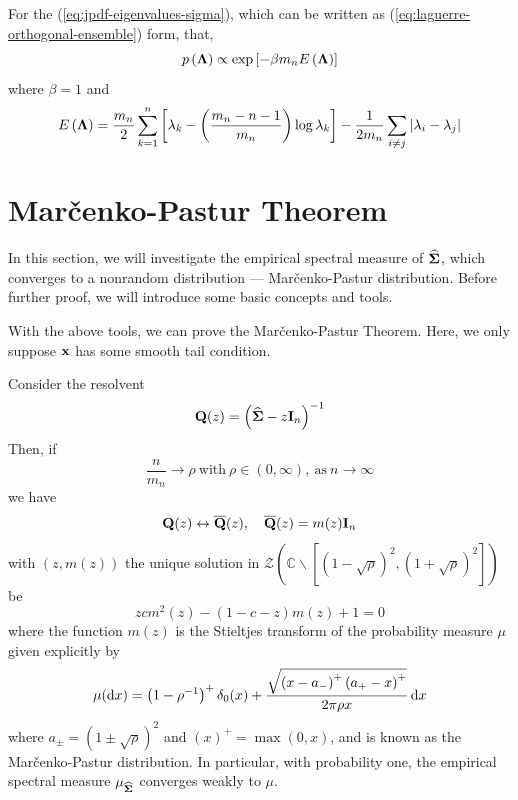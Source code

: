 \begin{remark}
	For the (\ref{eq:jpdf-eigenvalues-sigma}), which can be written as (\ref{eq:laguerre-orthogonal-ensemble}) form, that,
	\begin{equation*}
		p\left(\boldsymbol{\Lambda}\right)\propto\exp\left[-\beta m_{n}E\left(\boldsymbol{\Lambda}\right)\right]
	\end{equation*}
	where $\beta=1$ and
	\begin{equation*}
		E\left(\boldsymbol{\Lambda}\right)=\frac{m_{n}}{2}\sum_{k=1}^{n}\left[\lambda_{k}-\left(\frac{m_{n}-n-1}{m_{n}}\right)\log\lambda_{k}\right]-\frac{1}{2m_{n}}\sum_{i\neq j}\left|\lambda_{i}-\lambda_{j}\right|
	\end{equation*}
\end{remark}

\section{Mar\v{c}enko-Pastur Theorem}

In this section, we will investigate the empirical spectral measure of $\widehat{\boldsymbol{\Sigma}}$, which converges to a nonrandom distribution --- Mar\v{c}enko-Pastur distribution. Before further proof, we will introduce some basic concepts and tools.

With the above tools, we can prove the Mar\v{c}enko-Pastur Theorem. Here, we only suppose ${\bf x}$ has some smooth tail condition.
\begin{theorem} \label{thm:marcenko-pastur-theorem}
	Consider the resolvent
	\begin{equation*}
		{\bf Q}(z)=\left(\widehat{\boldsymbol{\Sigma}}-z\mathbf{I}_{n}\right)^{-1}
	\end{equation*}
	Then, if
	\begin{equation*}
		\frac{n}{m_{n}}\rightarrow\rho\ \text{with}\ \rho\in(0,\infty),\ \text{as}\ n\rightarrow\infty
	\end{equation*}
	we have
	\begin{equation*}
		{\bf Q}(z)\leftrightarrow\overline{{\bf Q}}(z),\quad\overline{{\bf Q}}(z)=m(z)\mathbf{I}_{n}
	\end{equation*}
	with $(z,m(z))$ the unique solution in $\mathcal{Z}\left(\mathbb{C}\backslash\left[(1-\sqrt{\rho})^{2},(1+\sqrt{\rho})^{2}\right]\right)$ be
	\begin{equation*}
		zcm^{2}(z)-(1-c-z)m(z)+1=0
	\end{equation*}
	where the function $m(z)$ is the Stieltjes transform of the probability measure $\mu$ given explicitly by
	\begin{equation*}
		\mu(\mathop{}\!\mathrm{d} x)=\left(1-\rho^{-1}\right)^{+}\delta_{0}(x)+\frac{\sqrt{\left(x-a_{-}\right)^{+}\left(a_{+}-x\right)^{+}}}{2\pi\rho x}\mathop{}\!\mathrm{d} x
	\end{equation*}
	where $a_{\pm}=(1 \pm \sqrt{\rho})^{2}$ and $(x)^{+}=\max (0, x)$, and is known as the Mar\v{c}enko-Pastur distribution. In particular, with probability one, the empirical spectral measure $\mu_{\widehat{\boldsymbol{\Sigma}}}$ converges weakly to $\mu $.
\end{theorem}

